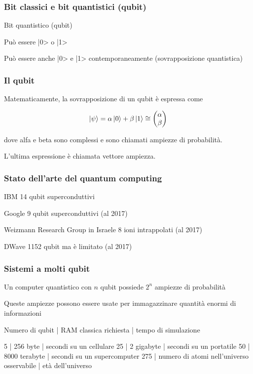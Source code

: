 \documentclass{beamer}
\begin{document}
	\begin{frame}
		\frametitle{Bit classici e bit quantistici (qubit)}
	

		Bit quantistico (qubit)

		Può essere |0> o |1>

		Può essere anche |0> e |1> contemporaneamente (sovrapposizione quantistica)
	
	\end{frame}

	\begin{frame}
		\frametitle{Il qubit}
	
		Matematicamente, la sovrapposizione di un qubit è espressa come 

		\begin{equation*}
			\ket{\psi} = \alpha \ket{0} + \beta \ket{1} \cong \begin{pmatrix}
				\alpha \\ \beta
			\end{pmatrix}
		\end{equation*}

		dove alfa e beta sono complessi e sono chiamati ampiezze di probabilità. 

		L'ultima espressione è chiamata vettore ampiezza. 
	
	\end{frame}

	\begin{frame}
		\frametitle{Stato dell'arte del quantum computing}
	
		IBM 14 qubit superconduttivi

		Google 9 qubit superconduttivi (al 2017)

		Weizmann Research Group in Israele 8 ioni intrappolati (al 2017)

		DWave 1152 qubit ma è limitato (al 2017)
	
	\end{frame}

	\begin{frame}
		\frametitle{Sistemi a molti qubit}
	
		Un computer quantistico con $n$ qubit possiede $2^n$ ampiezze di probabilità

		Queste ampiezze possono essere usate per immagazzinare quantità enormi di informazioni

		Numero di qubit | RAM classica richiesta | tempo di simulazione

		5 | 256 byte | secondi su un cellulare
		25 | 2 gigabyte | secondi su un portatile
		50 | 8000 terabyte | secondi su un supercomputer
		275 | numero di atomi nell'universo osservabile | età dell'universo
		
	\end{frame}
\end{document}
